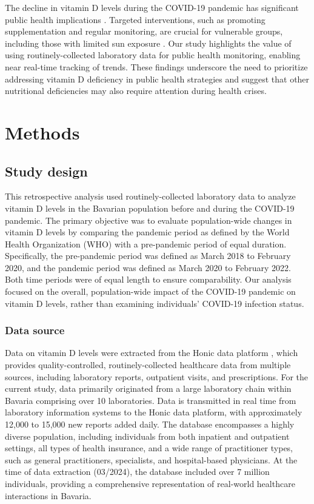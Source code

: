\documentclass[12pt]{article}
\begin{document}
The decline in vitamin D levels during the COVID-19 pandemic has significant public health implications \cite{Weir2020}. Targeted interventions, such as promoting supplementation and regular monitoring, are crucial for vulnerable groups, including those with limited sun exposure \cite{Katz2021}. Our study highlights the value of using routinely-collected laboratory data for public health monitoring, enabling near real-time tracking of trends. These findings underscore the need to prioritize addressing vitamin D deficiency in public health strategies and suggest that other nutritional deficiencies may also require attention during health crises.

\newpage
\section*{Methods}
\label{sec:methods}

\subsection*{Study design}

This retrospective analysis used routinely-collected laboratory data to analyze vitamin D levels in the Bavarian population before and during the COVID-19 pandemic. The primary objective was to evaluate population-wide changes in vitamin D levels by comparing the pandemic period as defined by the World Health Organization (WHO) \cite{who} with a pre-pandemic period of equal duration. Specifically, the pre-pandemic period was defined as March 2018 to February 2020, and the pandemic period was defined as March 2020 to February 2022. Both time periods were of equal length to ensure comparability. Our analysis focused on the overall, population-wide impact of the COVID-19 pandemic on vitamin D levels, rather than examining individuals' COVID-19 infection status.

\subsubsection*{Data source}

Data on vitamin D levels were extracted from the Honic data platform \cite{honic}, which provides quality-controlled, routinely-collected healthcare data from multiple sources, including laboratory reports, outpatient visits, and prescriptions. For the current study, data primarily originated from a large laboratory chain within Bavaria comprising over 10 laboratories. Data is transmitted in real time from laboratory information systems to the Honic data platform, with approximately 12,000 to 15,000 new reports added daily.  The database encompasses a highly diverse population, including individuals from both inpatient and outpatient settings, all types of health insurance, and a wide range of practitioner types, such as general practitioners, specialists, and hospital-based physicians. At the time of data extraction (03/2024), the database included over 7 million individuals, providing a comprehensive representation of real-world healthcare interactions in Bavaria.
\end{document}
